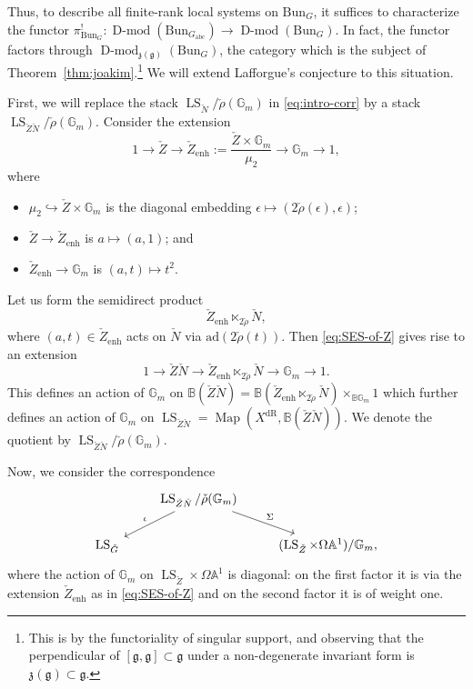 \documentclass[11pt]{amsart}
\newcommand{\fg}{\mathfrak{g}}
\newcommand{\fz}{\mathfrak{z}}
\newcommand{\bG}{\mathbb{G}}
\newcommand{\B}{\mathbb{B}}
\newcommand{\bA}{\mathbb{A}}
\newcommand{\dR}{\mathrm{dR}}
\newcommand{\Bun}{{\mathrm{Bun}}}
\newcommand{\abc}{{\mathrm{abc}}}
\DeclareMathOperator{\Dmod}{D-mod}
\DeclareMathOperator{\LS}{LS}
\DeclareMathOperator{\Map}{Map}
\theoremstyle{remark}
\theoremstyle{definition}
\begin{document}
Thus, to describe all finite-rank local systems on $\Bun_G$, it suffices to characterize the functor $\pi^!_{\Bun_G}\colon\Dmod(\Bun_{G_\abc})\to\Dmod(\Bun_G)$. In fact, the functor factors through $\Dmod_{\fz(\fg)}(\Bun_G)$, the category which is the subject of Theorem~\ref{thm:joakim}.\footnote{This is by the functoriality of singular support, and observing that the perpendicular of $[\fg,\fg]\subset\fg$ under a non-degenerate invariant form is $\fz(\fg)\subset\fg$.} We will extend Lafforgue's conjecture to this situation.

First, we will replace the stack $\LS_{\check N}/\check\rho(\bG_m)$ in \eqref{eq:intro-corr} by a stack $\LS_{\check Z\check N}/\check\rho(\bG_m)$. 
Consider the extension
\begin{equation}\label{eq:SES-of-Z}
1\to\check Z\to\check Z_{\mathrm{enh}}:=\frac{\check Z\times\bG_m}{\mu_2}\to \bG_m\to 1,
\end{equation}
where
\begin{itemize}
    \item $\mu_2\hookrightarrow\check Z\times\bG_m$ is the diagonal embedding $\epsilon\mapsto(2\check\rho(\epsilon),\epsilon)$;
\item $\check Z\to \check Z_{\mathrm{enh}}$ is $a\mapsto (a,1)$; and
\item $\check Z_{\mathrm{enh}}\to\bG_m$ is $(a,t)\mapsto t^2$.
\end{itemize}
Let us form the semidirect product
\[
\check Z_{\mathrm{enh}}\ltimes_{2\check\rho}\check N,
\]
where $(a,t)\in\check Z_{\mathrm{enh}}$ acts on $\check N$ via $\mathrm{ad}(2\check\rho(t))$. Then \eqref{eq:SES-of-Z} gives rise to an extension
\[
1\to\check Z\check N\to\check Z_{\mathrm{enh}}\ltimes_{2\check\rho}\check N\to \bG_m\to 1.
\]
This defines an action of $\bG_m$ on $\B(\check Z\check N)=\B(\check Z_{\mathrm{enh}}\ltimes_{2\check\rho}\check N)\times_{\B\bG_m}1$ which further defines an action of $\bG_m$ on $\LS_{\check Z\check N}=\Map(X^\dR,\B(\check Z\check N))$. We denote the quotient by $\LS_{\check Z\check N}/\check\rho(\bG_m)$.

Now, we consider the correspondence
\begin{equation}\label{eq:lafforgue-correspondence}
\begin{tikzcd}
    &\LS_{\check Z\check N}/\check\rho(\bG_m)\arrow[swap]{dl}{\iota}\arrow{dr}{\Sigma}\\
    \LS_{\check G}&&(\LS_{\check Z}\times\Omega\bA^1)/\bG_m,
\end{tikzcd}\end{equation}
where the action of $\bG_m$ on $\LS_{\check Z}\times\Omega\bA^1$ is diagonal: on the first factor it is via the extension $\check Z_{\mathrm{enh}}$ as in \eqref{eq:SES-of-Z} and on the second factor it is of weight one.
\end{document}
